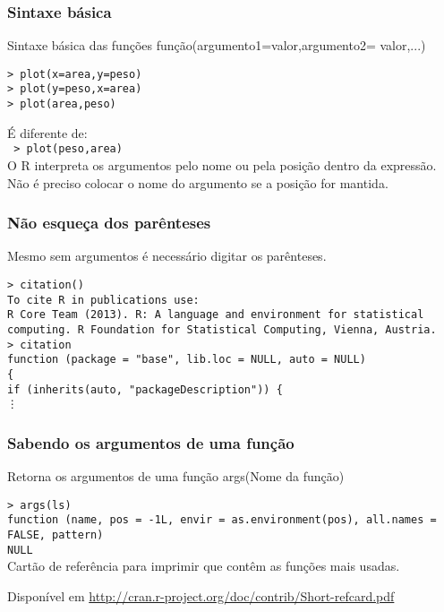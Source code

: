 \documentclass[handout]{beamer}
\begin{document}
 \begin{frame}
 \frametitle{Sintaxe básica}
 \begin{block}{Sintaxe básica das funções}
  função(argumento1=valor,argumento2= valor,...)
 \end{block}
 \texttt{> plot(x=area,y=peso)\\
        > plot(y=peso,x=area)\\
        > plot(area,peso)}

         \vspace{10pt} 
\pause
         É diferente de: \\
       \texttt{ > plot(peso,area)} \\
\pause
\vspace{10pt}
O R interpreta os argumentos pelo nome ou pela posição dentro da expressão. Não é preciso colocar o nome do argumento se a posição for mantida. 
 \end{frame}
 \begin{frame}
   \frametitle{Não esqueça dos parênteses}
   Mesmo sem argumentos é necessário digitar os parênteses. 
   \vspace{10pt}

\texttt{\small  > citation()\\
     \vspace{10pt}
    To cite R in publications use:\\ 
    \vspace{10pt}
  R Core Team (2013). R: A language and environment for statistical 
  computing. R Foundation for Statistical Computing, Vienna, Austria. \\
\pause
\vspace{10pt}
 > citation \\
 function (package =  "base", lib.loc = NULL, auto = NULL) \\
\{ \\
    if (inherits(auto, "packageDescription")) \{ \\
    \vdots   
  } 
 \end{frame}
 \begin{frame}
   \frametitle{Sabendo os argumentos de uma função}
   \begin{block}{Retorna os argumentos de uma função}
      args(Nome da função) \\
       \end{block}
\pause
\texttt{> args(ls) \\
function (name, pos = -1L, envir = as.environment(pos), all.names = FALSE, 
    pattern) \\
NULL\\}
\pause
\vspace{10pt}
   Cartão de referência para imprimir que contêm as funções mais usadas.

 Disponível em \url{http://cran.r-project.org/doc/contrib/Short-refcard.pdf}  

\end{frame}
\end{document}
